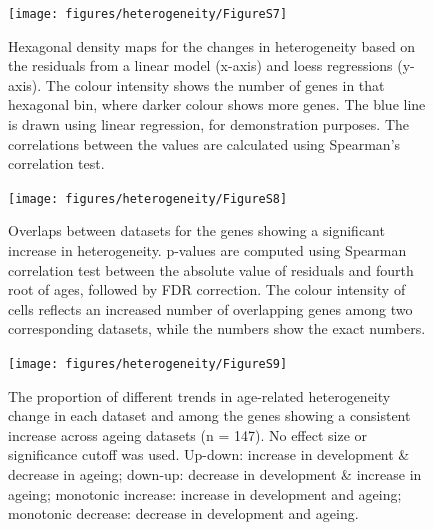 \documentclass[12pt,twoside]{unicam}
\begin{document}
\begin{figure}

{\centering \texttt{[image: figures/heterogeneity/FigureS7]} 

}

\caption[Correlations between heterogeneity estimates calculated using linear and loess regression.]{Hexagonal density maps for the changes in heterogeneity based on the residuals from a linear model (x-axis) and loess regressions (y-axis). The colour intensity shows the number of genes in that hexagonal bin, where darker colour shows more genes. The blue line is drawn using linear regression, for demonstration purposes. The correlations between the values are calculated using Spearman's correlation test.}\label{fig:hetFigS7}
\end{figure}

\begin{figure}

{\centering \texttt{[image: figures/heterogeneity/FigureS8]} 

}

\caption[Overlaps between datasets for the genes showing a significant increase in heterogeneity.]{Overlaps between datasets for the genes showing a significant increase in heterogeneity. p-values are computed using Spearman correlation test between the absolute value of residuals and fourth root of ages, followed by FDR correction. The colour intensity of cells reflects an increased number of overlapping genes among two corresponding datasets, while the numbers show the exact numbers.}\label{fig:hetFigS8}
\end{figure}

\begin{figure}

{\centering \texttt{[image: figures/heterogeneity/FigureS9]} 

}

\caption[Direction of change in gene expression heterogeneity in development and ageing across datasets.]{The proportion of different trends in age-related heterogeneity change in each dataset and among the genes showing a consistent increase across ageing datasets (n = 147). No effect size or significance cutoff was used. Up-down: increase in development \& decrease in ageing; down-up: decrease in development \& increase in ageing; monotonic increase: increase in development and ageing; monotonic decrease: decrease in development and ageing.}\label{fig:hetFigS9}
\end{figure}
\end{document}
